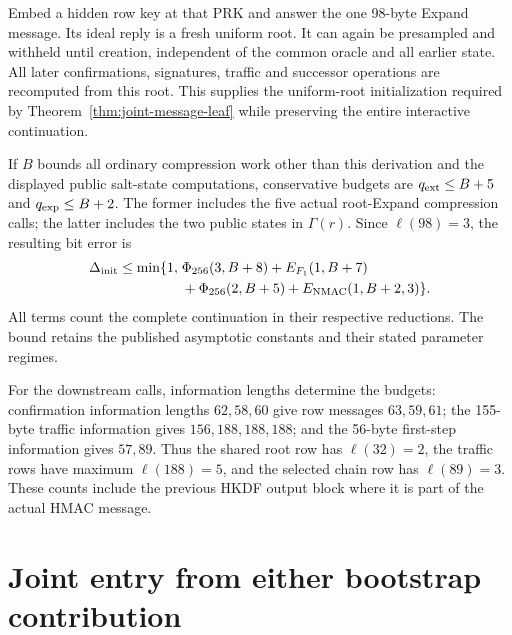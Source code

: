 \documentclass[pdflatex]{sn-jnl}
\theoremstyle{thmstyleone}
\theoremstyle{thmstylethree}
\theoremstyle{thmstyletwo}
\begin{document}
Embed a hidden row key at that PRK and answer the one 98-byte Expand
message. Its ideal reply is a fresh uniform root. It can again be
presampled and withheld until creation, independent of the common
oracle and all earlier state. All later confirmations, signatures,
traffic and successor operations are recomputed from this root.
This supplies the uniform-root initialization required by
Theorem~\ref{thm:joint-message-leaf} while preserving the entire interactive
continuation.

If $B$ bounds all ordinary compression work other than this derivation
and the displayed public salt-state computations, conservative budgets
are $q_{\rm ext}\le B+5$ and $q_{\rm exp}\le B+2$.
The former includes the five actual root-Expand compression calls; the
latter includes the two public states in $\Gamma(r)$.
Since $\ell(98)=3$, the resulting bit error is
\begin{equation}
\begin{split}
 \Delta_{\rm init}\le\min\{1,\;&
 \Phi_{256}(3,B+8)+E_{F_1}(1,B+7)\\
 &+\Phi_{256}(2,B+5)+E_{\rm NMAC}(1,B+2,3)\}.
\end{split}
 \label{eq:appendix-root-initialization}
\end{equation}
All terms count the complete continuation in their respective reductions.
The bound retains the published asymptotic constants and their stated
parameter regimes.

For the downstream calls, information lengths determine the budgets: confirmation
information lengths $62,58,60$ give row messages $63,59,61$; the
155-byte traffic information gives $156,188,188,188$; and the
56-byte first-step information gives $57,89$. Thus the shared root row
has $\ell(32)=2$, the traffic rows have maximum $\ell(188)=5$, and the
selected chain row has $\ell(89)=3$. These counts include the previous
HKDF output block where it is part of the actual HMAC message.
\section{Joint entry from either bootstrap contribution}
\label{app:bootstrap-entry}
\end{document}

